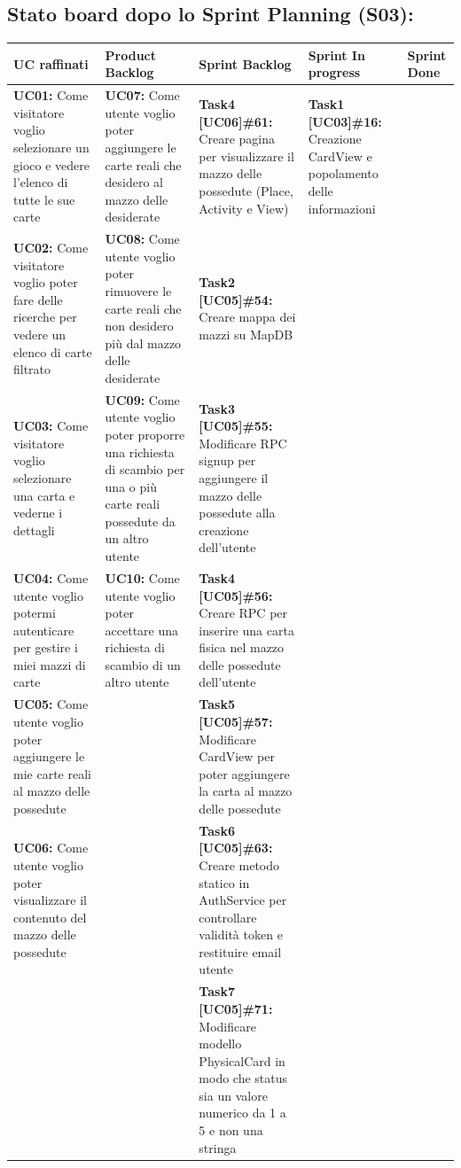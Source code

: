 \documentclass[a4paper, oneside]{article}
\begin{document}
\begin{landscape}
        \subsection{Stato board dopo lo Sprint Planning (S03):}
        \small
        \def\arraystretch{2}%
        \begin{tabular}{ | p{6cm} | p{5cm} | p{6.2cm} | p{3.8cm} | p{2cm}| }
            \hline
            \textbf{UC raffinati}
            & \textbf{Product Backlog}
            & \textbf{Sprint Backlog}
            & \textbf{Sprint In progress}
            & \textbf{Sprint Done} \\
            \hline
            \hline
            \textbf{UC01:} Come visitatore voglio selezionare un gioco e vedere l'elenco di tutte le sue carte & \textbf{UC07:} Come utente voglio poter aggiungere le carte reali che desidero al mazzo delle desiderate &\textbf{Task4 [UC06]\#61:} Creare pagina per visualizzare il mazzo delle possedute (Place, Activity e View) & \textbf{Task1 [UC03]\#16:} Creazione CardView e popolamento delle informazioni &
            \\
            \hline
            \textbf{UC02:} Come visitatore voglio poter fare delle ricerche per vedere un elenco di carte filtrato & \textbf{UC08:} Come utente voglio poter rimuovere le carte reali che non desidero più dal mazzo delle desiderate & \textbf{Task2 [UC05]\#54:} Creare mappa dei mazzi su MapDB & & \\
            \hline
            \textbf{UC03:} Come visitatore voglio selezionare una carta e vederne i dettagli & \textbf{UC09:} Come utente voglio poter proporre una richiesta di scambio per una o più carte reali possedute da un altro utente & \textbf{Task3 [UC05]\#55:} Modificare RPC signup per aggiungere il mazzo delle possedute alla creazione dell'utente & & \\
            \hline
            \textbf{UC04:}  Come utente voglio potermi autenticare per gestire i miei mazzi di carte & \textbf{UC10:} Come utente voglio poter accettare una richiesta di scambio di un altro utente & \textbf{Task4 [UC05]\#56:} Creare RPC per inserire una carta fisica nel mazzo delle possedute dell'utente & & \\
            \hline
            \textbf{UC05:} Come utente voglio poter aggiungere le mie carte reali al mazzo delle possedute & & \textbf{Task5 [UC05]\#57:} Modificare CardView per poter aggiungere la carta al mazzo delle possedute & & \\
            \hline
            \textbf{UC06:} Come utente voglio poter visualizzare il contenuto del mazzo delle possedute & & \textbf{Task6 [UC05]\#63:} Creare metodo statico in AuthService per controllare validità token e restituire email utente & & \\
            \hline
            & & \textbf{Task7 [UC05]\#71:} Modificare modello PhysicalCard in modo che status sia un valore numerico da 1 a 5 e non una stringa & & \\
            \hline


\end{tabular}
\end{landscape}
\end{document}
